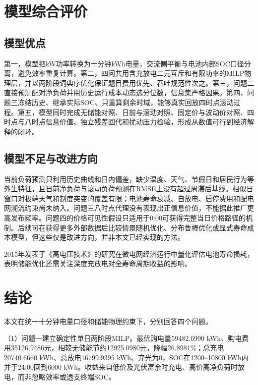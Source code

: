 \documentclass[UTF8,a4paper,12pt,fontset=fandol]{ctexart}
\numberwithin{equation}{section}
\begin{document}
\section{模型综合评价}

\subsection{模型优点}

第一，模型把kW功率转换为十分钟kWh电量，交流侧平衡与电池内部SOC口径分离，避免效率重复计算。第二，四问共用含充放电二元互斥和有限功率的MILP物理层，并以两阶段词典序优化保证题目费用优先、吞吐规范性次之。第三，问题二直接预测配对净负荷并用历史运行成本动态选分位数，信息集严格因果。第四，问题三冻结历史、继承实际SOC、只重算剩余时域，能够真实回放四时点滚动过程。第五，模型同时完成无储能对照、日前与滚动对照、固定价与波动价对照、四时点与八时点信息价值、独立残差回代和扰动压力检验，形成从数值可行到经济解释的闭环。

\subsection{模型不足与改进方向}

当前负荷预测只利用历史曲线和日内偏差，缺少温度、天气、节假日和居民行为等外生特征，且日前净负荷与滚动负荷预测在RMSE上没有超过周滞后基线。相似日窗口对极端天气和制度突变的覆盖有限；电池寿命衰减、自放电、启停费用和配电网潮流约束尚未纳入。问题三八时点代理没有表现出正信息价值，不能据此推广更高发布频率。问题四的价格可见性假设只适用于0:00可获得完整当日价格路径的机制。后续可在获得更多外部数据后比较情景随机优化、分布鲁棒优化或显式寿命成本模型，但这些仅是改进方向，并非本文已经实现的方法。

2015年发表于《高电压技术》的研究在微电网经济运行中量化评估电池寿命损耗，表明储能优化还需关注深度充放电对全寿命周期收益的影响\cite{xiao2015battery}。

\section{结论}

本文在统一十分钟电量口径和储能物理约束下，分别回答四个问题。

（1）问题一建立确定性单日两阶段MILP。最优购电量59482.6990 kWh、购电费用35126.9486元，相较无储能节约12925.0980元，降幅26.8981\%；总充电20740.6660 kWh、总放电16799.9395 kWh、弃光为0，SOC在1200--10800 kWh内并于24:00回到6000 kWh。收益来自低价及光伏富余时充电、高价高净负荷时放电，而非忽略效率或透支终端SOC。
\end{document}
